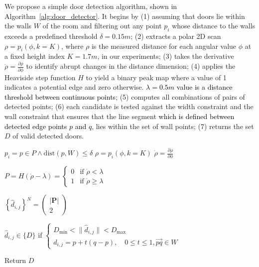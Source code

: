 \documentclass[10pt,a4paper]{article}
\begin{document}
\par

We propose a simple door detection algorithm, shown in Algorithm~\ref{alg:door_detector}.  It begins by (1) assuming that doors lie within the walls $W$ of the room and filtering out any point \( p_i \) whose distance to the walls exceeds a predefined threshold $\delta=0.15m$; (2) extracts a polar 2D scan \( \rho = p_i(\phi, k = K) \), where \( \rho \) is the measured distance for each angular value \( \phi \) at a fixed height index \( K = 1.7m \), in our experiments; (3) takes the derivative \( \dot{\rho} = \frac{\partial \rho} {\partial \phi} \) to identify abrupt changes in the distance dimension; (4) applies the Heaviside step function \( H \) to yield a binary peak map where a value of 1 indicates a potential edge and zero otherwise. \textcolor{black}{$\lambda=0.5m$ value is a distance threshold between continuous points}; (5) computes all combinations of pairs of detected points; (6) each candidate is tested against the width constraint and the wall constraint that ensures that the line segment \textcolor{black}{which is defined between detected edge points $p$ and $q$}, lies within the set of wall points; (7) returns the set \( D \) of valid detected doors.

\begin{algorithm}[h!]
\caption{Door detector algorithm}
\begin{algorithmic}[1]

    \State $p_i = p \in P \wedge  \mathrm{dist}(p, W) \leq \delta $  
    \State $\rho = p_i(\phi, k = K)$
    \State $\dot{\rho} = \frac{\partial \rho}{\partial \phi}$
    
    \State $P = H(\dot{\rho} - \lambda) = 
    \begin{cases} 
    0 & \text{if } \dot{\rho} < \lambda \\
    1 & \text{if } \dot{\rho} \geq \lambda 
    \end{cases}$
    
    \State $\left\{\hat{d}_{i,j}\right\}^N = \begin{pmatrix} |\mathbf{P}| \\ 2\end{pmatrix}$
    
    \State $\hat{d}_{i,j} \in \{D\} \text{ if } 
    \begin{cases} 
    D_{\min} < \|\hat{d}_{i,j}\| < D_{\max} \\
    d_{i,j} = p + t(q - p), \quad 0 \leq t \leq 1, \vec{pq} \in W
    \end{cases}$
    
    \State Return $D$
\end{algorithmic}
\label{alg:door_detector}
\end{algorithm}
\end{document}
